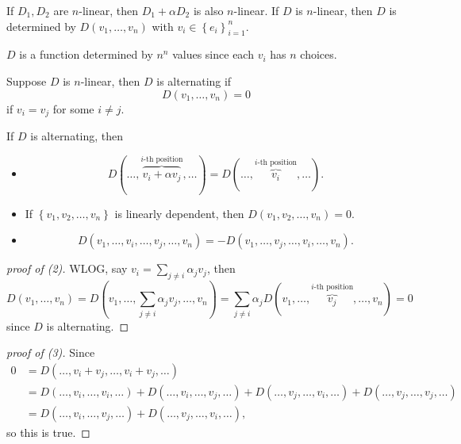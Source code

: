 \begin{lemma}
    If \(D_1, D_2\) are \(n\)-linear, then \(D_1 + \alpha D_2\) is also \(n\)-linear. If \(D\) is \(n\)-linear, then \(D\) is determined by \(D(v_1, \dots , v_n)\) with \(v_i \in \left\{ e_i \right\}_{i=1}^n \). 
    \begin{note}
        \(D\) is a function determined by \(n^n\) values since each \(v_i\) has \(n\) choices.
    \end{note}        
\end{lemma}

\begin{definition}[Alternating]
    Suppose \(D\) is \(n\)-linear, then \(D\) is alternating if 
    \[
        D(v_1, \dots , v_n) = 0
    \]  if \(v_i = v_j\) for some \(i \neq j\).  
\end{definition}

\begin{lemma}
    If \(D\) is alternating, then 
    \begin{itemize}
        \item [(1)]
        \[
            D ( \dots , \overbrace{v_i + \alpha v_j}^{i\text{-th position}}, \dots ) = D(\dots, \overbrace{v_i}^{i\text{-th position} }, \dots ). 
        \]
        \item [(2)] If \(\left\{ v_1, v_2, \dots , v_n \right\} \) is linearly dependent, then \(D(v_1, v_2, \dots , v_n) = 0\). 
        \item [(3)]
        \[
            D(v_1, \dots , v_i, \dots , v_j, \dots , v_n) = -D(v_1, \dots , v_j, \dots , v_i, \dots , v_n).
        \]
    \end{itemize}
\end{lemma}
\begin{proof}[proof of (2)]
    WLOG, say \(v_i = \sum_{j \neq i} \alpha _j v_j \), then 
    \[
        D(v_1, \dots , v_n) = D \left( v_1, \dots , \sum_{j \neq i} \alpha _j v_j, \dots , v_n \right) = \sum_{j \neq i} \alpha _j D ( v_1, \dots , \overbrace{v_j}^{i\text{-th position} }, \dots , v_n ) = 0   
    \] since \(D\) is alternating. 
    
\end{proof}
\begin{proof}[proof of (3)]
    Since 
    \begin{align*}
        0 &= D(\dots , v_i + v_j, \dots , v_i + v_j, \dots ) \\
        &= D(\dots , v_i, \dots , v_i, \dots ) + D(\dots , v_i, \dots , v_j, \dots ) + D(\dots , v_j, \dots , v_i, \dots ) + D(\dots , v_j, \dots , v_j, \dots ) \\
        &= D(\dots , v_i, \dots , v_j, \dots ) + D(\dots , v_j, \dots , v_i, \dots ), 
    \end{align*}
    so this is true.
\end{proof}

